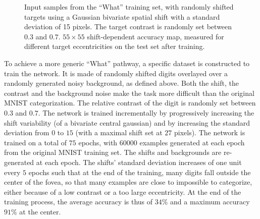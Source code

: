 \begin{figure}[t!]%
	\caption{\A Input samples from the ``What'' training set, with  randomly shifted targets using a Gaussian bivariate spatial shift with a standard deviation of 15 pixels. The target contrast is randomly set between $0.3$ and $0.7$.
	\B $55 \times 55$ shift-dependent accuracy map, measured for different target eccentricities on the test set after training.
	}
\label{fig:accuracy}
\end{figure}

To achieve a more generic ``What'' pathway, a specific dataset is constructed to train the network. It is made of randomly shifted digits overlayed over a randomly generated noisy background, as defined above. Both the shift, the contrast and the background noise make the task more difficult than the original MNIST categorization. The relative contrast of the digit is randomly set between $0.3$ and $0.7$.  The network is trained incrementally by progressively increasing the shift variability (of a bivariate central gaussian) and by increasing the standard deviation from $0$ to $15$ (with a maximal shift set at $27$ pixels). The network is trained on a total of $75$ epochs, with $60000$ examples generated at each epoch from the original MNIST training set. The shifts and backgrounds are re-generated at each epoch. The shifts' standard deviation increases of one unit every $5$ epochs such that at the end of the training, many digits fall outside the center of the fovea, so that many examples are close to impossible to categorize, either because of a low contrast or a too large eccentricity. At the end of the training process, the average accuracy is thus of $34\%$ and a maximum accuracy $91\%$ at the center.

